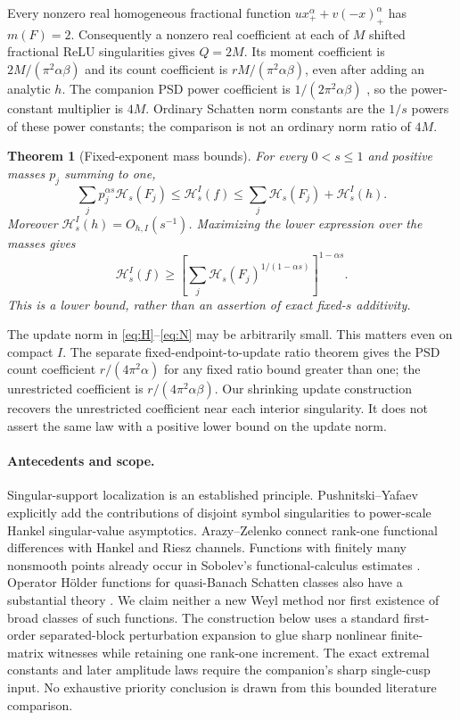 \documentclass[11pt]{article}
\newtheorem{theorem}{Theorem}[section]
\numberwithin{equation}{section}
\newcommand{\cH}{\mathcal H}
\begin{document}
Every nonzero real homogeneous fractional function
$u x_+^\alpha+v(-x)_+^\alpha$ has $m(F)=2$.
Consequently a nonzero real coefficient at each of $M$ shifted fractional
ReLU singularities gives $Q=2M$. Its moment coefficient is
$2M/(\pi^2\alpha\beta)$ and its count coefficient is
$rM/(\pi^2\alpha\beta)$, even after adding an analytic $h$.
The companion PSD power coefficient is $1/(2\pi^2\alpha\beta)$
\cite{Sharp}, so the power-constant multiplier is $4M$.
Ordinary Schatten norm constants are the $1/s$ powers of these power
constants; the comparison is not an ordinary norm ratio of $4M$.

\begin{theorem}[Fixed-exponent mass bounds]\label{thm:mass}
For every $0<s\le1$ and positive masses $p_j$ summing to one,
\begin{equation}\label{eq:mass}
 \sum_j p_j^{\alpha s}\cH_s(F_j)
 \le\cH_s^I(f)
 \le\sum_j\cH_s(F_j)+\cH_s^I(h).
\end{equation}
Moreover $\cH_s^I(h)=O_{h,I}(s^{-1})$. Maximizing the lower expression
over the masses gives
\begin{equation}\label{eq:optimized}
 \cH_s^I(f)\ge
 \left[\sum_j\cH_s(F_j)^{1/(1-\alpha s)}\right]^{1-\alpha s}.
\end{equation}
This is a lower bound, rather than an assertion of exact fixed-$s$
additivity.
\end{theorem}

The update norm in \eqref{eq:H}--\eqref{eq:N} may be arbitrarily small.
This matters even on compact $I$. The separate fixed-endpoint-to-update
ratio theorem \cite{Bounded} gives the PSD count coefficient
$r/(4\pi^2\alpha)$ for any fixed ratio bound greater than one; the
unrestricted coefficient is $r/(4\pi^2\alpha\beta)$.
Our shrinking update construction recovers the unrestricted coefficient
near each interior singularity. It does not assert the same law with a
positive lower bound on the update norm.

\paragraph{Antecedents and scope.}
Singular-support localization is an established principle.
Pushnitski--Yafaev \cite[Theorem 1.1]{PY} explicitly add the contributions
of disjoint symbol singularities to power-scale Hankel singular-value
asymptotics. Arazy--Zelenko \cite[Introduction and Section 2]{AZ}
connect rank-one functional differences with Hankel and Riesz channels.
Functions with finitely many nonsmooth points already occur in
Sobolev's functional-calculus estimates \cite{Sobolev}.
Operator H\"older functions for quasi-Banach Schatten classes also have
a substantial theory \cite{HSZ}. We claim neither a new Weyl method nor
first existence of broad classes of such functions. The construction
below uses a standard first-order separated-block perturbation expansion
to glue sharp nonlinear finite-matrix witnesses while retaining one
rank-one increment. The exact extremal constants and later amplitude
laws require the companion's sharp single-cusp input. No exhaustive
priority conclusion is drawn from this bounded literature comparison.
\end{document}

